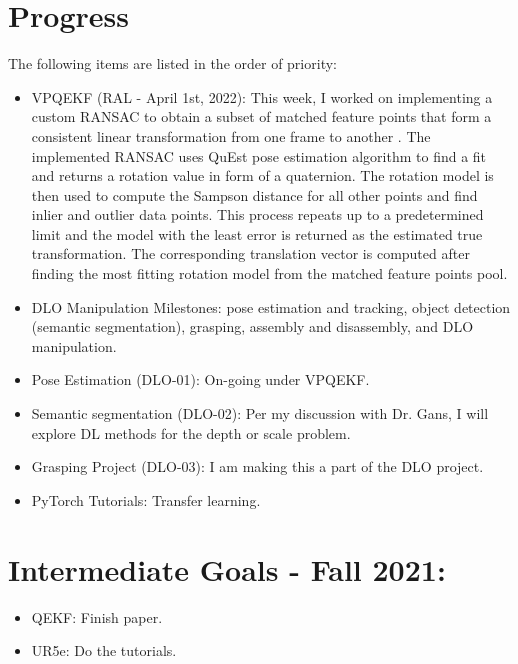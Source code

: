 \documentclass[11pt]{article}
\begin{document}
\section{Progress}
The following items are listed in the order of priority:
\begin{itemize}
    \item VPQEKF (RAL - April 1st, 2022): This week, I worked on implementing
    a custom RANSAC to obtain a subset of matched feature points that form
    a consistent linear transformation from one frame to another
    \cite{shi2013sift}. The implemented RANSAC uses QuEst pose estimation
    algorithm to find a fit and returns a rotation value in form of a
    quaternion. The rotation model is then used to compute the Sampson distance
    for all other points and find inlier and outlier data points. This process
    repeats up to a predetermined limit and the model with the least error is
    returned as the estimated true transformation. The corresponding translation
    vector is computed after finding the most fitting rotation model from the
    matched feature points pool.
    \item DLO Manipulation Milestones: pose estimation and tracking,
    object detection (semantic segmentation), grasping, assembly and
    disassembly, and DLO manipulation.
    \item Pose Estimation (DLO-01): On-going under VPQEKF.
    \item Semantic segmentation (DLO-02): Per my discussion with Dr. Gans, I
    will explore DL methods for the depth or scale problem.
    \item Grasping Project (DLO-03): I am making this a part of the DLO project.
    \item PyTorch Tutorials: Transfer learning.

  \end{itemize}

\section{Intermediate Goals - Fall 2021:}
\begin{itemize}
      \item QEKF: Finish paper.
      \item UR5e: Do the tutorials.
\end{itemize}

\newpage

\newpage


\end{document}
